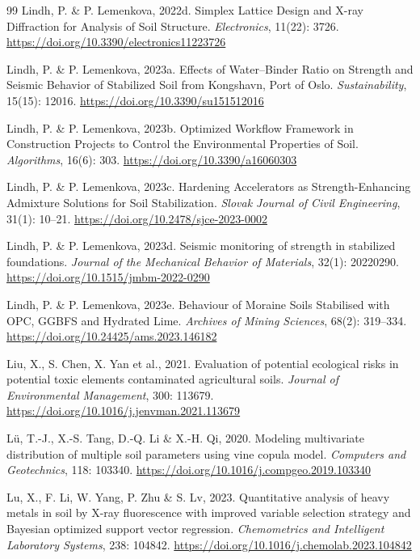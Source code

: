 \documentclass[sn-mathphys-num]{sn-jnl}
\begin{document}
\begin{thebibliography}{99}
Lindh, P. \& P. Lemenkova, 2022d.
Simplex Lattice Design and X-ray Diffraction for Analysis of Soil Structure.
\textit{Electronics}, 11(22): 3726.
\url{https://doi.org/10.3390/electronics11223726}

Lindh, P. \& P. Lemenkova, 2023a.
Effects of Water--Binder Ratio on Strength and Seismic Behavior of Stabilized
Soil from Kongshavn, Port of Oslo.
\textit{Sustainability}, 15(15): 12016.
\url{https://doi.org/10.3390/su151512016}

Lindh, P. \& P. Lemenkova, 2023b.
Optimized Workflow Framework in Construction Projects to Control the
Environmental Properties of Soil.
\textit{Algorithms}, 16(6): 303.
\url{https://doi.org/10.3390/a16060303}

Lindh, P. \& P. Lemenkova, 2023c.
Hardening Accelerators as Strength-Enhancing Admixture Solutions for Soil
Stabilization.
\textit{Slovak Journal of Civil Engineering}, 31(1): 10--21.
\url{https://doi.org/10.2478/sjce-2023-0002}

Lindh, P. \& P. Lemenkova, 2023d.
Seismic monitoring of strength in stabilized foundations.
\textit{Journal of the Mechanical Behavior of Materials}, 32(1): 20220290.
\url{https://doi.org/10.1515/jmbm-2022-0290}

Lindh, P. \& P. Lemenkova, 2023e.
Behaviour of Moraine Soils Stabilised with OPC, GGBFS and Hydrated Lime.
\textit{Archives of Mining Sciences}, 68(2): 319--334.
\url{https://doi.org/10.24425/ams.2023.146182}

Liu, X., S. Chen, X. Yan et al., 2021.
Evaluation of potential ecological risks in potential toxic elements
contaminated agricultural soils.
\textit{Journal of Environmental Management}, 300: 113679.
\url{https://doi.org/10.1016/j.jenvman.2021.113679}

L\"{u}, T.-J., X.-S. Tang, D.-Q. Li \& X.-H. Qi, 2020.
Modeling multivariate distribution of multiple soil parameters using vine
copula model.
\textit{Computers and Geotechnics}, 118: 103340.
\url{https://doi.org/10.1016/j.compgeo.2019.103340}

Lu, X., F. Li, W. Yang, P. Zhu \& S. Lv, 2023.
Quantitative analysis of heavy metals in soil by X-ray fluorescence with
improved variable selection strategy and Bayesian optimized support vector
regression.
\textit{Chemometrics and Intelligent Laboratory Systems}, 238: 104842.
\url{https://doi.org/10.1016/j.chemolab.2023.104842}


\end{thebibliography}
\end{document}
